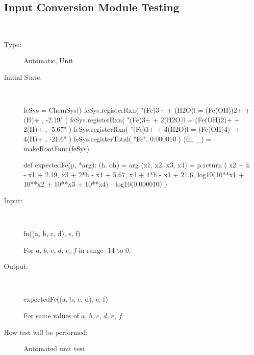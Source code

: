 \documentclass[12pt, titlepage]{article}
\newcounter{testnum} %
\begin{document}
\subsection{Input Conversion Module Testing}
\begin{addmargin}[2em]{0em}

\\
\begin{addmargin}[2em]{0em}
\begin{description}
\item[Type:] Automatic, Unit
					
\item[Initial State:] ~\newline

\begin{python}
feSys = ChemSys()
feSys.registerRxn(
  "(Fe)3+ + (H2O)l = (Fe(OH))2+ + (H)+ , -2.19"
)
feSys.registerRxn(
  "(Fe)3+ + 2(H2O)l = (Fe(OH)2)+ + 2(H)+ , -5.67"
)
feSys.registerRxn(
  "(Fe)3+ + 4(H2O)l = (Fe(OH)4)- + 4(H)+ , -21.6"
)
feSys.registerTotal(
  "Fe", 0.000010
)
(fn, _) = makeRootFunc(feSys)

def expectedFe(p, *arg):
  (h, oh) = arg
  (x1, x2, x3, x4) = p
  return ( x2 + h - x1 + 2.19, 
           x3 + 2*h - x1 + 5.67,
           x4 + 4*h - x1 + 21.6,
           log10(10**x1 + 10**x2 + 10**x3 + 10**x4) 
             - log10(0.000010) )
\end{python}
					
\item[Input:] ~\newline

\begin{python}
fn((a, b, c, d), e, f)
\end{python}

For $a$, $b$, $c$, $d$, $e$, $f$ in range -14 to 0.
					
\item[Output:] ~\newline

\begin{python}
expectedFe((a, b, c, d), e, f)
\end{python}

For same values of $a$, $b$, $c$, $d$, $e$, $f$.
					
\item[How test will be performed:] Automated unit test\\
\end{description}
\end{addmargin}



\end{addmargin}
\end{document}
